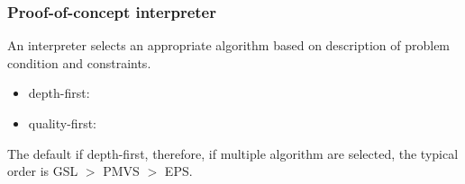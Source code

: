 \documentclass{beamer}
\begin{document}
\begin{frame}
\frametitle{Proof-of-concept interpreter}

An interpreter selects an appropriate algorithm based on description of problem condition and constraints.

\begin{itemize}
\item depth-first:
\item quality-first:
\end{itemize}

The default if depth-first, therefore, if multiple algorithm are selected, the typical order is GSL $>$ PMVS $>$ EPS.

\end{frame}

\end{document}
